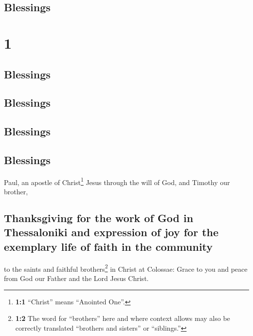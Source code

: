 \hypertarget{blessings}{%
\subsection{Blessings}\label{blessings}}

\hypertarget{section}{%
\section{1}\label{section}}

\hypertarget{blessings-1}{%
\subsection{Blessings}\label{blessings-1}}

\hypertarget{blessings-2}{%
\subsection{Blessings}\label{blessings-2}}

\hypertarget{blessings-3}{%
\subsection{Blessings}\label{blessings-3}}

\hypertarget{blessings-4}{%
\subsection{Blessings}\label{blessings-4}}

 Paul, an apostle of Christ\footnote{\textbf{1:1}
  ``Christ'' means ``Anointed One''.} Jesus through the will of God, and
Timothy our brother,

\hypertarget{thanksgiving-for-the-work-of-god-in-thessaloniki-and-expression-of-joy-for-the-exemplary-life-of-faith-in-the-community}{%
\subsection{Thanksgiving for the work of God in Thessaloniki and
expression of joy for the exemplary life of faith in the
community}\label{thanksgiving-for-the-work-of-god-in-thessaloniki-and-expression-of-joy-for-the-exemplary-life-of-faith-in-the-community}}

 to the saints and faithful brothers\footnote{\textbf{1:2}
  The word for ``brothers'' here and where context allows may also be
  correctly translated ``brothers and sisters'' or ``siblings.''} in
Christ at Colossae: Grace to you and peace from God our Father and the
Lord Jesus Christ.

